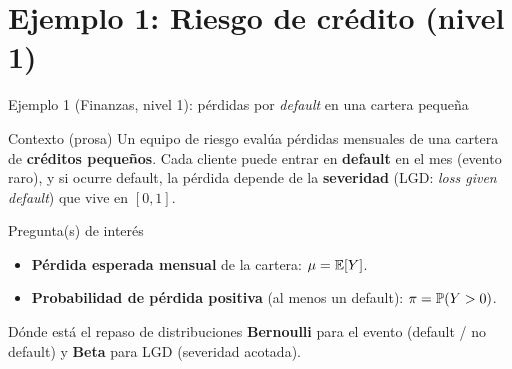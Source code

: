 \documentclass[aspectratio=1610, 9pt]{beamer}
\begin{document}
\section*{Ejemplo 1: Riesgo de crédito (nivel 1)}

\begin{frame}{Ejemplo 1 (Finanzas, nivel 1): pérdidas por \emph{default} en una cartera pequeña}
\small
\begin{block}{Contexto (prosa)}
Un equipo de riesgo evalúa pérdidas mensuales de una cartera de \textbf{créditos pequeños}.
Cada cliente puede entrar en \textbf{default} en el mes (evento raro), y si ocurre default,
la pérdida depende de la \textbf{severidad} (LGD: \emph{loss given default}) que vive en $[0,1]$.
\end{block}

\begin{block}{Pregunta(s) de interés}
\begin{itemize}
\item \textbf{Pérdida esperada mensual} de la cartera: $\mu=\mathbb{E}[Y]$.
\item \textbf{Probabilidad de pérdida positiva} (al menos un default): $\pi=\mathbb{P}(Y>0)$.
\end{itemize}
\end{block}

\begin{alertblock}{Dónde está el repaso de distribuciones}
\textbf{Bernoulli} para el evento (default / no default) y \textbf{Beta} para LGD (severidad acotada).
\end{alertblock}
\end{frame}
\end{document}
